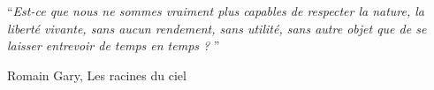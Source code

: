 \vspace*{0.2\textheight}

\begin{addmargin}[0.3\linewidth]{0em}
    \begin{flushright}
    \enquote{\itshape Est-ce que  nous ne sommes vraiment plus capables de respecter la nature, la liberté vivante, sans aucun rendement, sans utilité, sans autre objet que de se laisser entrevoir de temps en temps ? }\bigbreak
    
    \hfill Romain Gary, Les racines du ciel
    \end{flushright}
    
\end{addmargin}